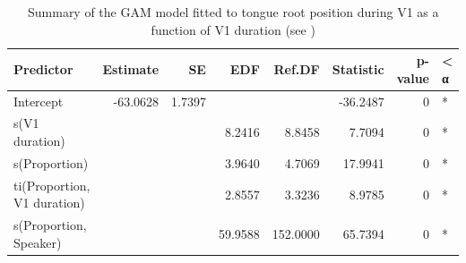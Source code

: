 \documentclass[preprint]{JASAnew}
\begin{document}
\begin{table}

\caption{\label{tab:tra-gam-ar-2-table}Summary of the GAM model fitted to tongue root position during V1 as a function of V1 duration (see )}
\centering
\fontsize{10}{12}\selectfont
\begin{tabular}[t]{lrrrrrrl}
\toprule
Predictor & Estimate & SE & EDF & Ref.DF & Statistic & p-value & < α\\
\midrule
Intercept & -63.0628 & 1.7397 &  &  & -36.2487 & 0 & *\\
s(V1 duration) &  &  & 8.2416 & 8.8458 & 7.7094 & 0 & *\\
s(Proportion) &  &  & 3.9640 & 4.7069 & 17.9941 & 0 & *\\
ti(Proportion, V1 duration) &  &  & 2.8557 & 3.3236 & 8.9785 & 0 & *\\
s(Proportion, Speaker) &  &  & 59.9588 & 152.0000 & 65.7394 & 0 & *\\
\bottomrule
\end{tabular}
\end{table}










\end{document}
